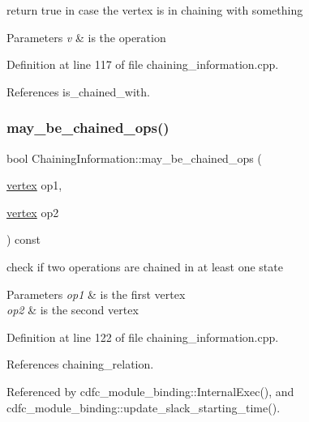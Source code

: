 return true in case the vertex is in chaining with something 


\begin{DoxyParams}{Parameters}
{\em v} & is the operation \\
\hline
\end{DoxyParams}


Definition at line 117 of file chaining\+\_\+information.\+cpp.



References is\+\_\+chained\+\_\+with.

\mbox{\label{classChainingInformation_a071c018afe565b6950876779213150ec}} 
\subsubsection{\texorpdfstring{may\+\_\+be\+\_\+chained\+\_\+ops()}{may\_be\_chained\_ops()}}
{\footnotesize\ttfamily bool Chaining\+Information\+::may\+\_\+be\+\_\+chained\+\_\+ops (\begin{DoxyParamCaption}\item[{\hyperlink{graph_8hpp_abefdcf0544e601805af44eca032cca14}{vertex}}]{op1,  }\item[{\hyperlink{graph_8hpp_abefdcf0544e601805af44eca032cca14}{vertex}}]{op2 }\end{DoxyParamCaption}) const}



check if two operations are chained in at least one state 


\begin{DoxyParams}{Parameters}
{\em op1} & is the first vertex \\
\hline
{\em op2} & is the second vertex \\
\hline
\end{DoxyParams}


Definition at line 122 of file chaining\+\_\+information.\+cpp.



References chaining\+\_\+relation.



Referenced by cdfc\+\_\+module\+\_\+binding\+::\+Internal\+Exec(), and cdfc\+\_\+module\+\_\+binding\+::update\+\_\+slack\+\_\+starting\+\_\+time().

